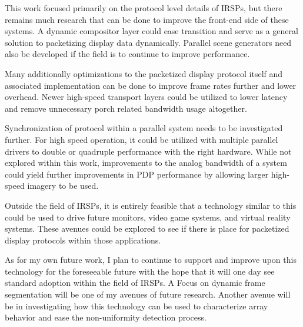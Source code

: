This work focused primarily on the protocol level details of IRSPs, but there remains much research that can be done to improve the front-end side of these systems. A dynamic compositor layer could ease transition and serve as a general solution to packetizing display data dynamically. Parallel scene generators need also be developed if the field is to continue to improve performance.

Many additionally optimizations to the packetized display protocol itself and associated implementation can be done to improve frame rates further and lower overhead. Newer high-speed transport layers could be utilized to lower latency and remove unnecessary porch related bandwidth usage altogether.

Synchronization of protocol within a parallel system needs to be investigated further. For high speed operation, it could be utilized with multiple parallel drivers to double or quadruple performance with the right hardware. While not explored within this work, improvements to the analog bandwidth of a system could yield further improvements in PDP performance by allowing larger high-speed imagery to be used.

Outside the field of IRSPs, it is entirely feasible that a technology similar to this could be used to drive future monitors, video game systems, and virtual reality systems. These avenues could be explored to see if there is place for packetized display protocols within those applications.

As for my own future work, I plan to continue to support and improve upon this technology for the foreseeable future with the hope that it will one day see standard adoption within the field of IRSPs. A Focus on dynamic frame segmentation will be one of my avenues of future research. Another avenue will be in investigating how this technology can be used to characterize array behavior and ease the non-uniformity detection process.





